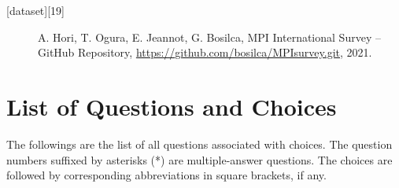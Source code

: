 \documentclass[preprint,5p,times]{elsarticle}
\begin{document}


{\footnotesize
  \begin{description}
  \item[{[dataset][19]}] A. Hori, T. Ogura, E. Jeannot,
G. Bosilca, MPI International Survey – GitHub Repository,
\url{https://github.com/bosilca/MPIsurvey.git}, 2021.
  \end{description}
}

\appendix
\section{List of Questions and Choices}
\label{app:questions}

The followings are the list of all questions associated with
choices. The question numbers suffixed by asterisks (*) are
multiple-answer questions. The choices are followed by corresponding
abbreviations in square brackets, if any.
\vspace{2mm}
\end{document}
